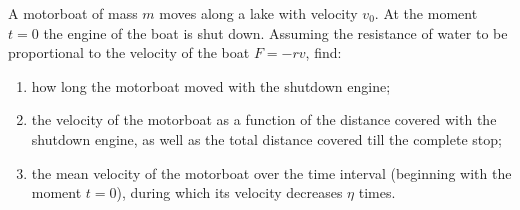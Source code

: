 \item A motorboat of mass \( m \) moves along a lake with velocity \( v_0 \). At the moment \( t = 0 \) the engine of the boat is shut down. Assuming the resistance of water to be proportional to the velocity of the boat \( F = -rv \), find:
    \begin{enumerate}
        \item how long the motorboat moved with the shutdown engine;
        \item the velocity of the motorboat as a function of the distance covered with the shutdown engine, as well as the total distance covered till the complete stop;
        \item the mean velocity of the motorboat over the time interval (beginning with the moment \( t = 0 \)), during which its velocity decreases \( \eta \) times.
    \end{enumerate}